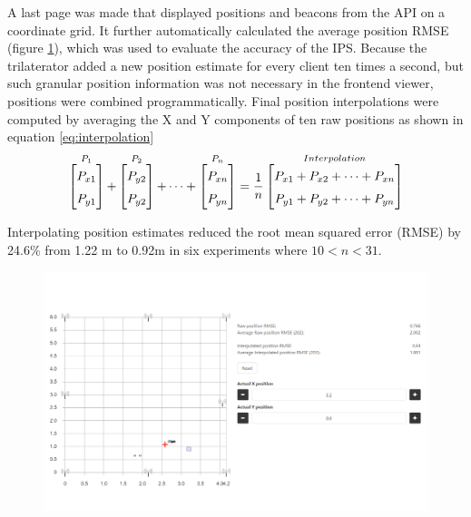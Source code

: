 \documentclass[a4paper, oneside]{ipsreport}
\begin{document}
A last page was made that displayed positions and beacons from the API on a coordinate grid. It further automatically calculated the average position RMSE (figure \ref{fig:map}), which was used to evaluate the accuracy of the IPS. Because the trilaterator added a new position estimate for every client ten times a second, but such granular position information was not necessary in the frontend viewer, positions were combined programmatically. Final position interpolations were computed by averaging the X and Y components of ten raw positions as shown in equation \ref{eq:interpolation}
\begin{equation}
	\setlength{\arraycolsep}{0pt}%
	\renewcommand{\arraystretch}{1.5}%
	\mathop{\begin{bmatrix}
	  P_{x1} \\ P_{y1}
	\end{bmatrix}}^{P_1}
	+
	\mathop{\begin{bmatrix}
	  P_{y2} \\ P_{y2}
	\end{bmatrix}}^{P_2}
	+ \dots +
	\mathop{\begin{bmatrix}
	  P_{xn} \\ P_{yn}
	\end{bmatrix}}^{P_n}
	=
	\dfrac{1}{n}
	\mathop{\begin{bmatrix}
	  P_{x1} + P_{x2} + \dots + P_{xn} \\
	  P_{y1} + P_{y2} + \dots + P_{yn} \\
	\end{bmatrix}}^{Interpolation}
	\label{eq:interpolation}
\end{equation}

Interpolating position estimates reduced the root mean squared error (RMSE) by 24.6\% from 1.22 m to 0.92m in six experiments where $10 < n < 31$.

\begin{figure}[h]
\centering
\includegraphics[width=0.95\linewidth]{./figures/map.png}
\label{fig:map}
\end{figure}
\end{document}
